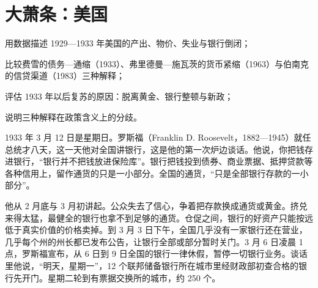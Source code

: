 \chapter{大萧条：美国}\label{ch:depressionus}

\begin{chapterguide}
\begin{guidegoals}
\item 用数据描述 1929—1933 年美国的产出、物价、失业与银行倒闭；
\item 比较费雪的债务—通缩（1933）、弗里德曼—施瓦茨的货币紧缩（1963）与伯南克的信贷渠道（1983）三种解释；
\item 评估 1933 年以后复苏的原因：脱离黄金、银行整顿与新政；
\item 说明三种解释在政策含义上的分歧。
\end{guidegoals}
\end{chapterguide}

1933 年 3 月 12 日是星期日。罗斯福（Franklin D. Roosevelt，1882—1945）就任总统才八天，这一天他对全国讲银行，这是他的第一次炉边谈话\cite{fdr1933,bnf28,frhholiday}。他说，你把钱存进银行，“银行并不把钱放进保险库”。银行把钱投到债券、商业票据、抵押贷款等各种信用上，留作通货的只是一小部分\cite{fdr1933}。全国的通货，“只是全部银行存款的一小部分”\cite{fdr1933}。

他从 2 月底与 3 月初讲起。公众失去了信心，争着把存款换成通货或黄金。挤兑来得太猛，最健全的银行也拿不到足够的通货。仓促之间，银行的好资产只能按远低于真实价值的价格卖掉。到 3 月 3 日下午，全国几乎没有一家银行还在营业，几乎每个州的州长都已发布公告，让银行全部或部分暂时关门\cite{fdr1933}。3 月 6 日凌晨 1 点，罗斯福宣布，从 6 日到 9 日全国的银行一律休假，暂停一切银行业务\cite{app1933}。谈话里他说，“明天，星期一”，12 个联邦储备银行所在城市里经财政部初查合格的银行先开门。星期二轮到有票据交换所的城市，约 250 个\cite{fdr1933}。

